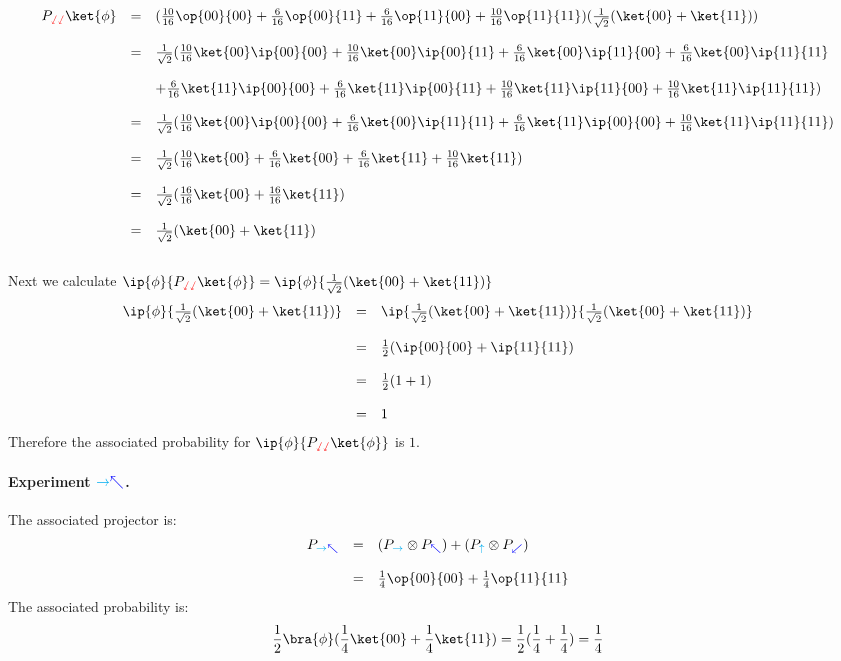 \documentclass{article}
\newcommand{\xplus}{{\color{cyan}\rightarrow}}
\newcommand{\xminus}{{\color{cyan}\uparrow}}
\newcommand{\yplus}{{\color{blue}\nwarrow}}
\newcommand{\yminus}{{\color{blue}\swarrow}}
\newcommand{\zplus}{{\color{red}\sswarrow}}
\theoremstyle{remark}
\def\srtt{\frac{1}{\sqrt{2}}}
\begin{document}
\[\begin{array}{rcl}
P_{\zplus\zplus}\ket{\phi} 
    &=& (\frac{10}{16} \op{00}{00}
        + \frac{6}{16} \op{00}{11} 
        + \frac{6}{16} \op{11}{00} 
        + \frac{10}{16} \op{11}{11} )(\frac{1}{\sqrt{2}}(\ket{00} + \ket{11}))
    \\ \\
    &=& \srtt(\frac{10}{16}\ket{00}\ip{00}{00}
        + \frac{10}{16}\ket{00}\ip{00}{11}
        + \frac{6}{16}\ket{00}\ip{11}{00}
        + \frac{6}{16}\ket{00}\ip{11}{11}
        \\ \\
        && +  \frac{6}{16}\ket{11}\ip{00}{00}
        + \frac{6}{16}\ket{11}\ip{00}{11}
        + \frac{10}{16} \ket{11}\ip{11}{00}
        + \frac{10}{16} \ket{11}\ip{11}{11}
        )
    \\ \\
    &=& \srtt(\frac{10}{16}\ket{00}\ip{00}{00}
        + \frac{6}{16}\ket{00}\ip{11}{11} 
        +  \frac{6}{16}\ket{11}\ip{00}{00}
        + \frac{10}{16} \ket{11}\ip{11}{11}
        )
    \\ \\
    &=& \srtt(\frac{10}{16}\ket{00}
        + \frac{6}{16}\ket{00}
        +  \frac{6}{16}\ket{11}
        + \frac{10}{16} \ket{11}
        )
    \\ \\
    &=& \srtt(\frac{16}{16}\ket{00} + \frac{16}{16} \ket{11})
    \\ \\
    &=& \srtt(\ket{00} + \ket{11})
\end{array}\]
\\
Next we calculate 
$\ip{\phi}{P_{\zplus\zplus}\ket{\phi}} = \ip{\phi}{\srtt(\ket{00} + \ket{11})}$
\[
    \begin{array}{rcl}
    \ip{\phi}{\srtt(\ket{00} + \ket{11})}
        &=& \ip{\srtt(\ket{00} + \ket{11})}{\srtt(\ket{00} + \ket{11})} 
        \\ \\
        &=& \frac{1}{2}(\ip{00}{00} + \ip{11}{11})
        \\ \\
        &=& \frac{1}{2}(1 + 1) 
        \\ \\
        &=& 1
    \end{array}
\]
Therefore the associated probability for 
$\ip{\phi}{P_{\zplus\zplus}\ket{\phi}}$ is $1$.

\newpage
\paragraph*{Experiment $\xplus\yplus$.} The associated projector is:
\[\begin{array}{rcl}
P_{\xplus\yplus}
&=& (P_{\xplus}\otimes P_{\yplus}) + (P_{\xminus} \otimes P_{\yminus})
    \\ \\
&=& \frac{1}{4} \op{00}{00} + \frac{1}{4} \op{11}{11} 
\end{array}\]
The associated probability is:
\[
  \frac{1}{2} \bra{\phi} (\frac{1}{4} \ket{00} + \frac{1}{4} \ket{11}) = 
  \frac{1}{2} (\frac{1}{4} + \frac{1}{4}) = \frac{1}{4}
\]
\end{document}
